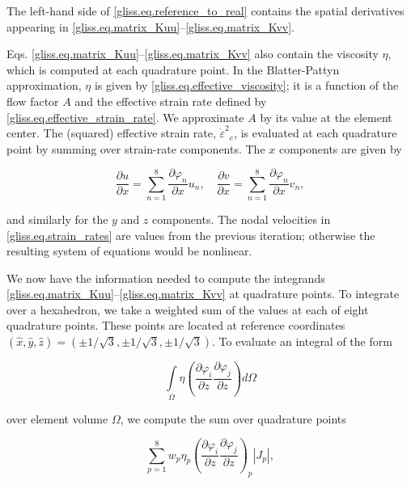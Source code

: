 \noindent
The left-hand side of \eqref{gliss.eq.reference_to_real} contains the spatial derivatives 
appearing in \eqref{gliss.eq.matrix_Kuu}--\eqref{gliss.eq.matrix_Kvv}.

Eqs. \eqref{gliss.eq.matrix_Kuu}--\eqref{gliss.eq.matrix_Kvv} also contain the viscosity $\eta$,
which is computed at each quadrature point.
In the Blatter-Pattyn approximation, $\eta$ is given by \eqref{gliss.eq.effective_viscosity};
it is a function of the flow factor $A$ and the effective strain rate defined by \eqref{gliss.eq.effective_strain_rate}.
We approximate $A$ by its value at the element center.
The (squared) effective strain rate, ${{\dot{\varepsilon }}^{2}}_{e}$, is evaluated at each quadrature point
by summing over strain-rate components.  The $x$ components are given by

\begin{equation}
  \label{gliss.eq.strain_rates}
  \frac{\partial u}{\partial x}=\sum\limits_{n=1}^{8}{\frac{\partial {{\varphi }_{n}}}{\partial x}}{{u}_{n}}, \quad
  \frac{\partial v}{\partial x}=\sum\limits_{n=1}^{8}{\frac{\partial {{\varphi }_{n}}}{\partial x}}{{v}_{n}},
\end{equation}

\noindent
and similarly for the $y$ and $z$ components.  The nodal velocities in \eqref{gliss.eq.strain_rates}
are values from the previous iteration; otherwise the resulting system of equations would be nonlinear.

We now have the information needed to compute the integrands \eqref{gliss.eq.matrix_Kuu}--\eqref{gliss.eq.matrix_Kvv}
at quadrature points. To integrate over a hexahedron, we take a weighted sum of the values at each
of eight quadrature points.  These points are located at
reference coordinates $(\hat{x},\hat{y},\hat{z}) = (\pm 1/\sqrt{3}, \pm 1/\sqrt{3}, \pm 1/\sqrt{3})$.
To evaluate an integral of the form

\begin{equation}
  \int\limits_{\Omega }{\eta \left( \frac{\partial {{\varphi }_{i}}}{\partial z}\frac{\partial {{\varphi }_{j}}}{\partial z} \right)}d\Omega
\end{equation}

\noindent
over element volume $\Omega$, we compute the sum over quadrature points

\begin{equation}
  \label{gliss.eq.sum_over_qp}
  \sum\limits_{p=1}^{8}{{{w}_{p}}{{\eta }_{p}}{{\left( \frac{\partial {{\varphi }_{i}}}{\partial z}\frac{\partial {{\varphi }_{j}}}{\partial z} \right)}_{p}}}|J_p|,
\end{equation}

